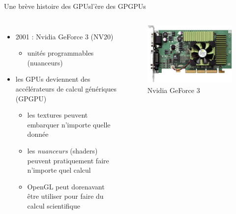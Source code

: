 \documentclass[11pt,mathserif]{beamer}
\begin{document}
\begin{frame}{Une brève histoire des GPUs}{l'ère des GPGPUs}
  \begin{columns}[t]
    \column{6cm}
    \begin{itemize}[<+->]
      \item 2001 : Nvidia GeForce 3 (NV20)
        \begin{itemize}
          \item unités programmables (nuanceurs)
         \end{itemize}
       \item les GPUs deviennent des accélérateurs de calcul génériques (GPGPU)
        \begin{itemize}
          \item les textures peuvent embarquer n'importe quelle donnée
          \item les {\em nuanceurs}\/ (shaders) peuvent pratiquement faire
            n'importe quel calcul
          \item OpenGL peut dorenavant être utiliser pour faire du calcul scientifique
         \end{itemize}
    \end{itemize} 
    \column{6cm}
\begin{figure}[htbp]
  \includegraphics[width=0.8\linewidth]{fig/geforce3.jpg}
      \caption{\tiny Nvidia GeForce 3}
 \end{figure}
  \end{columns}
\end{frame}
\end{document}
